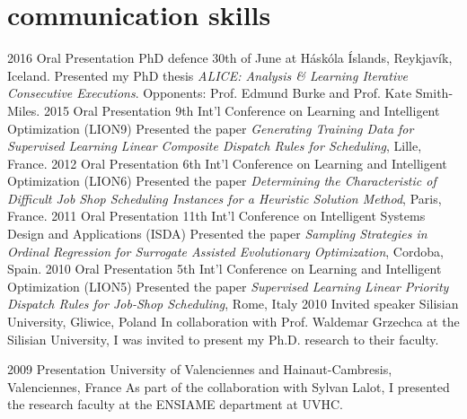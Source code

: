 \documentclass[]{cv} %
\begin{document}
\section{communication skills}
\begin{entrylist}
\entry
{2016}
{Oral Presentation}
{PhD defence 30th of June at Háskóla Íslands, Reykjavík, Iceland.}
{Presented my PhD thesis \emph{ALICE: Analysis \& Learning Iterative 
Consecutive Executions}. 
Opponents: Prof. Edmund Burke and Prof. Kate Smith-Miles.}
\entry
{2015}
{Oral Presentation}
{9th Int'l Conference on Learning and Intelligent Optimization (LION9)}
{Presented the paper \emph{ Generating Training Data for Supervised Learning 
Linear Composite Dispatch Rules for Scheduling}, Lille, France.}
\entry
{2012}
{Oral Presentation}
{6th Int'l Conference on Learning and Intelligent Optimization (LION6)}
{Presented the paper \emph{ Determining the Characteristic of Difficult Job 
Shop Scheduling Instances for a Heuristic Solution Method}, Paris,  France.}
\entry
{2011}
{Oral Presentation}
{11th Int'l Conference on Intelligent Systems Design and Applications (ISDA)}
{Presented the paper  \emph{Sampling Strategies in Ordinal Regression for 
Surrogate Assisted Evolutionary Optimization}, Cordoba, Spain.}
\entry
{2010}
{Oral Presentation}
{5th Int'l Conference on Learning and Intelligent Optimization (LION5)}
{Presented the paper \emph{Supervised Learning Linear Priority Dispatch Rules 
for Job-Shop Scheduling}, Rome, Italy}
\entry
{2010}
{Invited speaker}
{Silisian University, Gliwice, Poland}
{In collaboration with Prof. Waldemar Grzechca at the Silisian University, I was invited to present my Ph.D. research to their faculty.}
\end{entrylist}
\begin{entrylist}
\entry
{2009}
{Presentation }
{University of Valenciennes and Hainaut-Cambresis, Valenciennes, France}
{As part of the collaboration with Sylvan Lalot, I presented the research faculty at the ENSIAME department at UVHC.}
\end{entrylist}
\end{document}
